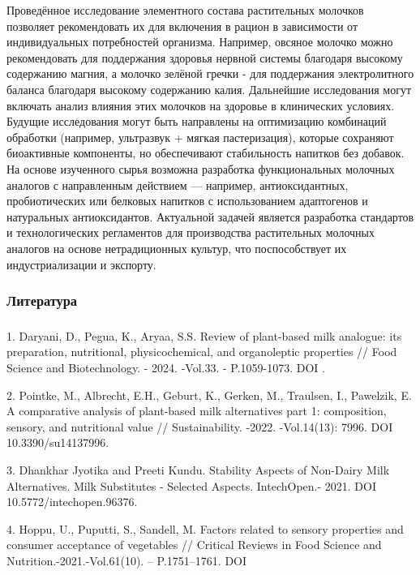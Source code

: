 Проведённое исследование элементного состава растительных молочков
позволяет рекомендовать их для включения в рацион в зависимости от
индивидуальных потребностей организма. Например, овсяное молочко можно
рекомендовать для поддержания здоровья нервной системы благодаря
высокому содержанию магния, а молочко зелёной гречки - для поддержания
электролитного баланса благодаря высокому содержанию калия. Дальнейшие
исследования могут включать анализ влияния этих молочков на здоровье в
клинических условиях. Будущие исследования могут быть направлены на
оптимизацию комбинаций обработки (например, ультразвук + мягкая
пастеризация), которые сохраняют биоактивные компоненты, но обеспечивают
стабильность напитков без добавок. На основе изученного сырья возможна
разработка функциональных молочных аналогов с направленным действием ---
например, антиоксидантных, пробиотических или белковых напитков с
использованием адаптогенов и натуральных антиоксидантов. Актуальной
задачей является разработка стандартов и технологических регламентов для
производства растительных молочных аналогов на основе нетрадиционных
культур, что поспособствует их индустриализации и экспорту.

\subsubsection{Литература}\label{ux43bux438ux442ux435ux440ux430ux442ux443ux440ux430}

\subsubsection{}\label{section}

1. Daryani, D., Pegua, K., Aryaa, S.S. Review of plant-based milk
analogue: its preparation, nutritional, physicochemical, and
organoleptic properties // Food Science and Biotechnology. - 2024.
-Vol.33. - P.1059-1073. DOI
\href{https://doi.org/10.1007/s10068-023-01482-z}{}.

2. Pointke, M., Albrecht, E.H., Geburt, K., Gerken, M., Traulsen, I.,
Pawelzik, E. A comparative analysis of plant-based milk alternatives
part 1: composition, sensory, and nutritional value // Sustainability.
-2022. -Vol.14(13): 7996. DOI 10.3390/su14137996.

3. Dhankhar Jyotika and Preeti Kundu. Stability Aspects of Non-Dairy Milk
Alternatives. Milk Substitutes - Selected Aspects. IntechOpen.- 2021.
DOI 10.5772/intechopen.96376.

4. Hoppu, U., Puputti, S., Sandell, M. Factors related to sensory
properties and consumer acceptance of vegetables // Critical Reviews in
Food Science and Nutrition.-2021.-Vol.61(10). -- P.1751--1761. DOI
\href{https://doi.org/10.1080/10408398.2020.1767034}{}

